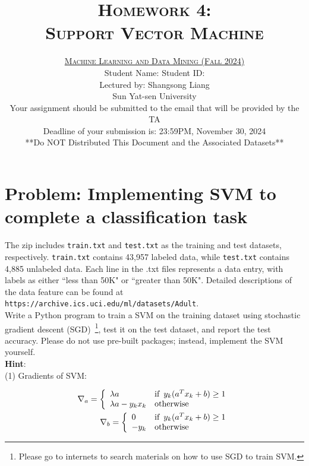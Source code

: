\documentclass[a4paper]{article}
\title{\textsc{Homework 4: \\  Support Vector Machine}} %
\author{\href{xx}{\textsc{Machine Learning and Data Mining (Fall 2024)}} \\[0.5em] 
Student Name: \hspace{13em} Student ID: \\[0.5em]
Lectured by: Shangsong Liang \\
Sun Yat-sen University\\
Your assignment should be submitted to the email that will be provided by the TA \\
Deadline of your submission is: 23:59PM, November 30, 2024\\
**Do NOT Distributed This Document and the Associated Datasets**}
\date{}
\theoremstyle{definition}
\begin{document}
\maketitle 
\section*{Problem: Implementing SVM to complete a classification task}
The zip includes \texttt{train.txt} and \texttt{test.txt} as the training and test datasets, respectively. \texttt{train.txt} contains 43,957 labeled data, while \texttt{test.txt} contains 4,885 unlabeled data. Each line in the .txt files represents a data entry, with labels as either ``less than 50K" or ``greater than 50K". 
Detailed descriptions of the data feature can be found at \texttt{https://archive.ics.uci.edu/ml/datasets/Adult}.\\

Write a Python program to train a SVM on the training dataset using stochastic gradient descent (SGD)~\footnote{Please go to internets to search materials on how to use SGD to train SVM.}, test it on the test dataset, and report the test accuracy. Please do not use pre-built packages; instead, implement the SVM yourself.\\

\textbf{Hint}: \\
(1) Gradients of SVM:

\begin{align*}
\begin{split}
\nabla_a= \left \{
\begin{array}{ll}%
     \lambda a          & \text{if}\hspace{0.5em} y_k(a^Tx_k+b)\geq 1\\
    \lambda a - y_kx_k                          & \text{otherwise}
\end{array}
\right.
\end{split}
\\
\begin{split}
\nabla_b= \left \{
\begin{array}{ll}%
     0         & \text{if}\hspace{0.5em} y_k(a^Tx_k+b)\geq 1\\
    - y_k                      & \text{otherwise}
\end{array}
\right.
\end{split}
\end{align*}
\end{document}
